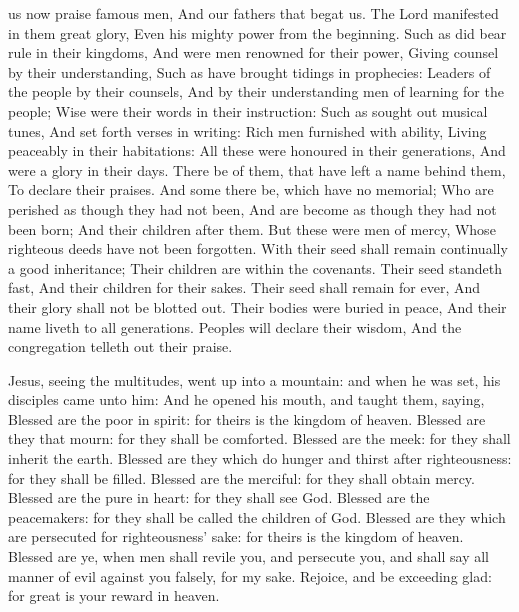  us now praise famous men, And our fathers that begat us. The Lord manifested in them great glory, Even his mighty power from the beginning. Such as did bear rule in their kingdoms, And were men renowned for their power, Giving counsel by their understanding, Such as have brought tidings in prophecies: Leaders of the people by their counsels, And by their understanding men of learning for the people; Wise were their words in their instruction: Such as sought out musical tunes, And set forth verses in writing: Rich men furnished with ability, Living peaceably in their habitations: All these were honoured in their generations, And were a glory in their days. There be of them, that have left a name behind them, To declare their praises. And some there be, which have no memorial; Who are perished as though they had not been, And are become as though they had not been born; And their children after them. But these were men of mercy, Whose righteous deeds have not been forgotten. With their seed shall remain continually a good inheritance; Their children are within the covenants. Their seed standeth fast, And their children for their sakes. Their seed shall remain for ever, And their glory shall not be blotted out. Their bodies were buried in peace, And their name liveth to all generations. Peoples will declare their wisdom, And the congregation telleth out their praise.


\alleluianotice


 Jesus, seeing the multitudes, went up into a mountain: and when he was set, his disciples came unto him: And he opened his mouth, and taught them, saying, Blessed are the poor in spirit: for theirs is the kingdom of heaven. Blessed are they that mourn: for they shall be comforted. Blessed are the meek: for they shall inherit the earth. Blessed are they which do hunger and thirst after righteousness: for they shall be filled. Blessed are the merciful: for they shall obtain mercy. Blessed are the pure in heart: for they shall see God. Blessed are the peacemakers: for they shall be called the children of God. Blessed are they which are persecuted for righteousness' sake: for theirs is the kingdom of heaven. Blessed are ye, when men shall revile you, and persecute you, and shall say all manner of evil against you falsely, for my sake. Rejoice, and be exceeding glad: for great is your reward in heaven.

